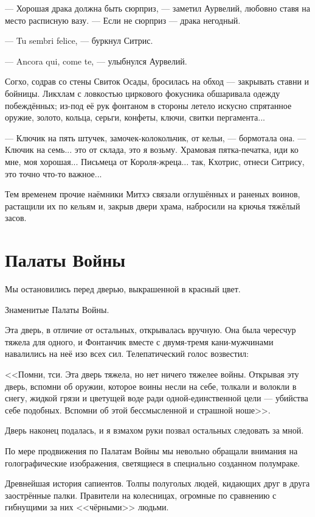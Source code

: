 --- Хорошая драка должна быть сюрприз, --- заметил Аурвелий, любовно ставя на место расписную вазу.
--- Если не сюрприз --- драка негодный.

--- Tu sembri felice\FM, --- буркнул Ситрис.

--- Ancora qui, come te, --- улыбнулся Аурвелий.

Согхо, содрав со стены Свиток Осады, бросилась на обход --- закрывать ставни и бойницы.
Ликхлам с ловкостью циркового фокусника обшаривала одежду побеждённых;
из-под её рук фонтаном в стороны летело искусно спрятанное оружие, золото, кольца, серьги, конфеты, ключи, свитки пергамента...

--- Ключик на пять штучек, замочек-колокольчик, от кельи, --- бормотала она.
--- Ключик на семь... это от склада, это я возьму.
Храмовая пятка-печатка, иди ко мне, моя хорошая...
Письмеца от Короля-жреца... так, Кхотрис, отнеси Ситрису, это точно что-то важное...

Тем временем прочие наёмники Митхэ связали оглушённых и раненых воинов, растащили их по кельям и, закрыв двери храма, набросили на крючья тяжёлый засов.

\section{Палаты Войны}

Мы остановились перед дверью, выкрашенной в красный цвет.

Знаменитые Палаты Войны.

Эта дверь, в отличие от остальных, открывалась вручную.
Она была чересчур тяжела для одного, и Фонтанчик вместе с двумя-тремя кани-мужчинами навалились на неё изо всех сил.
Телепатический голос возвестил:

<<Помни, тси.
Эта дверь тяжела, но нет ничего тяжелее войны.
Открывая эту дверь, вспомни об оружии, которое воины несли на себе, толкали и волокли в снегу, жидкой грязи и цветущей воде ради одной-единственной цели --- убийства себе подобных.
Вспомни об этой бессмысленной и страшной ноше>>.

Дверь наконец подалась, и я взмахом руки позвал остальных следовать за мной.

По мере продвижения по Палатам Войны мы невольно обращали внимания на голографические изображения, светящиеся в специально созданном полумраке.

Древнейшая история сапиентов.
Толпы полуголых людей, кидающих друг в друга заострённые палки.
Правители на колесницах, огромные по сравнению с гибнущими за них <<чёрными>> людьми.

